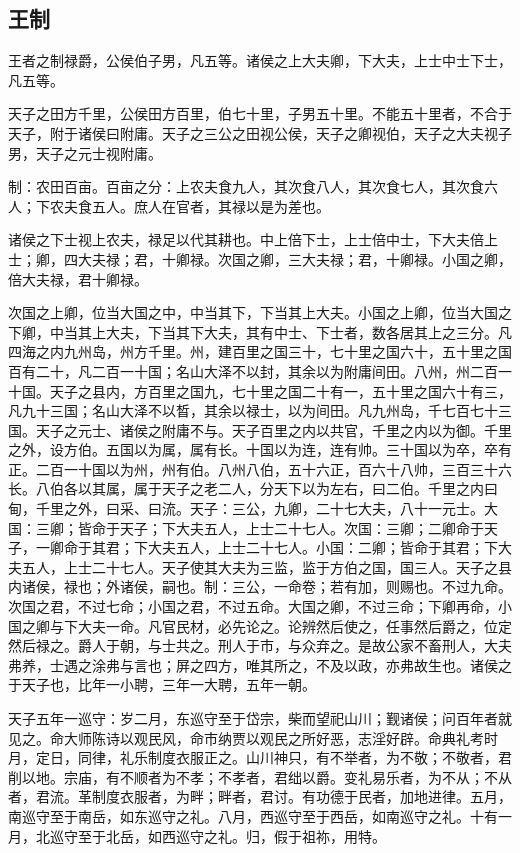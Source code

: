 \documentclass[]{article}
\begin{document}
\hypertarget{header-n266}{%
\subsection{王制}\label{header-n266}}

王者之制禄爵，公侯伯子男，凡五等。诸侯之上大夫卿，下大夫，上士中士下士，凡五等。

天子之田方千里，公侯田方百里，伯七十里，子男五十里。不能五十里者，不合于天子，附于诸侯曰附庸。天子之三公之田视公侯，天子之卿视伯，天子之大夫视子男，天子之元士视附庸。

制：农田百亩。百亩之分：上农夫食九人，其次食八人，其次食七人，其次食六人；下农夫食五人。庶人在官者，其禄以是为差也。

诸侯之下士视上农夫，禄足以代其耕也。中上倍下士，上士倍中士，下大夫倍上士；卿，四大夫禄；君，十卿禄。次国之卿，三大夫禄；君，十卿禄。小国之卿，倍大夫禄，君十卿禄。

次国之上卿，位当大国之中，中当其下，下当其上大夫。小国之上卿，位当大国之下卿，中当其上大夫，下当其下大夫，其有中士、下士者，数各居其上之三分。凡四海之内九州岛，州方千里。州，建百里之国三十，七十里之国六十，五十里之国百有二十，凡二百一十国；名山大泽不以封，其余以为附庸间田。八州，州二百一十国。天子之县内，方百里之国九，七十里之国二十有一，五十里之国六十有三，凡九十三国；名山大泽不以晳，其余以禄士，以为间田。凡九州岛，千七百七十三国。天子之元士、诸侯之附庸不与。天子百里之内以共官，千里之内以为御。千里之外，设方伯。五国以为属，属有长。十国以为连，连有帅。三十国以为卒，卒有正。二百一十国以为州，州有伯。八州八伯，五十六正，百六十八帅，三百三十六长。八伯各以其属，属于天子之老二人，分天下以为左右，曰二伯。千里之内曰甸，千里之外，曰采、曰流。天子：三公，九卿，二十七大夫，八十一元士。大国：三卿；皆命于天子；下大夫五人，上士二十七人。次国：三卿；二卿命于天子，一卿命于其君；下大夫五人，上士二十七人。小国：二卿；皆命于其君；下大夫五人，上士二十七人。天子使其大夫为三监，监于方伯之国，国三人。天子之县内诸侯，禄也；外诸侯，嗣也。制：三公，一命卷；若有加，则赐也。不过九命。次国之君，不过七命；小国之君，不过五命。大国之卿，不过三命；下卿再命，小国之卿与下大夫一命。凡官民材，必先论之。论辨然后使之，任事然后爵之，位定然后禄之。爵人于朝，与士共之。刑人于市，与众弃之。是故公家不畜刑人，大夫弗养，士遇之涂弗与言也；屏之四方，唯其所之，不及以政，亦弗故生也。诸侯之于天子也，比年一小聘，三年一大聘，五年一朝。

天子五年一巡守：岁二月，东巡守至于岱宗，柴而望祀山川；觐诸侯；问百年者就见之。命大师陈诗以观民风，命市纳贾以观民之所好恶，志淫好辟。命典礼考时月，定日，同律，礼乐制度衣服正之。山川神只，有不举者，为不敬；不敬者，君削以地。宗庙，有不顺者为不孝；不孝者，君绌以爵。变礼易乐者，为不从；不从者，君流。革制度衣服者，为畔；畔者，君讨。有功德于民者，加地进律。五月，南巡守至于南岳，如东巡守之礼。八月，西巡守至于西岳，如南巡守之礼。十有一月，北巡守至于北岳，如西巡守之礼。归，假于祖祢，用特。
\end{document}
